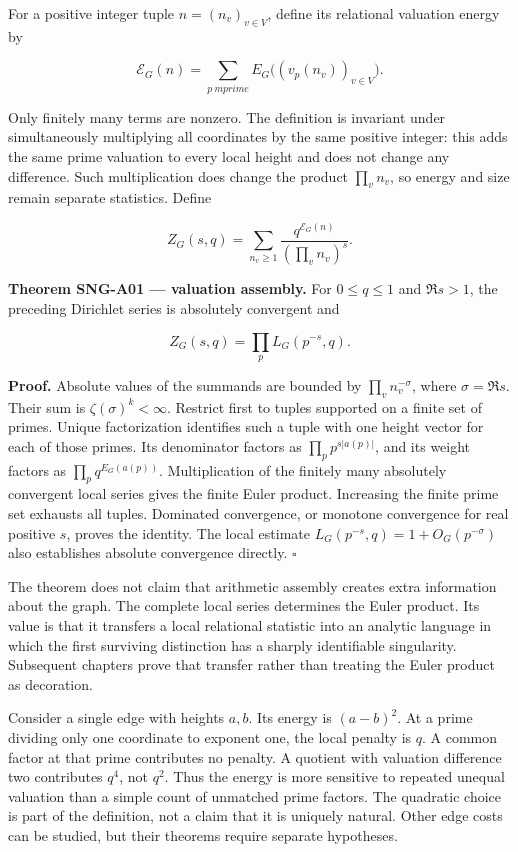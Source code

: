 \documentclass[
  11pt,
  a4paper,
]{report}
\begin{document}
For a positive integer tuple \(n=(n_v)_{v\in V}\), define its relational
valuation energy by

\[
 \mathcal E_G(n)=\sum_{p\ {
m prime}}
 E_G\bigl((v_p(n_v))_{v\in V}\bigr).
\]

Only finitely many terms are nonzero. The definition is invariant under
simultaneously multiplying all coordinates by the same positive integer:
this adds the same prime valuation to every local height and does not
change any difference. Such multiplication does change the product
\(\prod_vn_v\), so energy and size remain separate statistics. Define

\[
 Z_G(s,q)=\sum_{n_v\ge1}
 \frac{q^{\mathcal E_G(n)}}{(\prod_vn_v)^s}.
\]

\textbf{Theorem SNG-A01 --- valuation assembly.} For \(0\le q\le1\) and
\(\Re s>1\), the preceding Dirichlet series is absolutely convergent and

\[
 Z_G(s,q)=\prod_pL_G(p^{-s},q).
\]

\textbf{Proof.} Absolute values of the summands are bounded by
\(\prod_vn_v^{-\sigma}\), where \(\sigma=\Re s\). Their sum is
\(\zeta(\sigma)^k<\infty\). Restrict first to tuples supported on a
finite set of primes. Unique factorization identifies such a tuple with
one height vector for each of those primes. Its denominator factors as
\(\prod_pp^{s|a(p)|}\), and its weight factors as
\(\prod_pq^{E_G(a(p))}\). Multiplication of the finitely many absolutely
convergent local series gives the finite Euler product. Increasing the
finite prime set exhausts all tuples. Dominated convergence, or monotone
convergence for real positive \(s\), proves the identity. The local
estimate \(L_G(p^{-s},q)=1+O_G(p^{-\sigma})\) also establishes absolute
convergence directly. \(\square\)

The theorem does not claim that arithmetic assembly creates extra
information about the graph. The complete local series determines the
Euler product. Its value is that it transfers a local relational
statistic into an analytic language in which the first surviving
distinction has a sharply identifiable singularity. Subsequent chapters
prove that transfer rather than treating the Euler product as
decoration.

Consider a single edge with heights \(a,b\). Its energy is \((a-b)^2\).
At a prime dividing only one coordinate to exponent one, the local
penalty is \(q\). A common factor at that prime contributes no penalty.
A quotient with valuation difference two contributes \(q^4\), not
\(q^2\). Thus the energy is more sensitive to repeated unequal valuation
than a simple count of unmatched prime factors. The quadratic choice is
part of the definition, not a claim that it is uniquely natural. Other
edge costs can be studied, but their theorems require separate
hypotheses.
\end{document}
